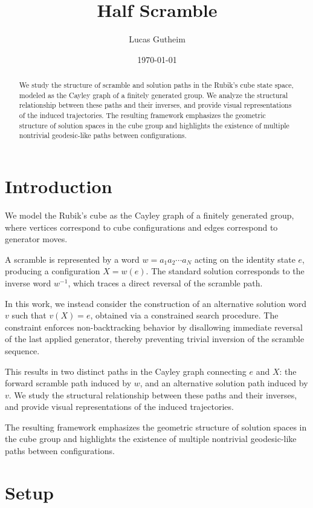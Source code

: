 \documentclass{article}
\title{Half Scramble}
\author{Lucas Gutheim}
\date{\today}
\begin{document}
\maketitle

\begin{abstract}
	We study the structure of scramble and solution paths in the Rubik's cube state space, modeled as the Cayley graph of a finitely generated group. We analyze the structural relationship between these paths and their inverses, and provide visual representations of the induced trajectories. The resulting framework emphasizes the geometric structure of solution spaces in the cube group and highlights the existence of multiple nontrivial geodesic-like paths between configurations.
\end{abstract}

\section{Introduction}

We model the Rubik's cube as the Cayley graph of a finitely generated group, where vertices correspond to cube configurations and edges correspond to generator moves.

A scramble is represented by a word $w = a_1 a_2 \cdots a_N$ acting on the identity state $e$, producing a configuration $X = w(e)$. The standard solution corresponds to the inverse word $w^{-1}$, which traces a direct reversal of the scramble path.

In this work, we instead consider the construction of an alternative solution word $v$ such that $v(X) = e$, obtained via a constrained search procedure. The constraint enforces non-backtracking behavior by disallowing immediate reversal of the last applied generator, thereby preventing trivial inversion of the scramble sequence.

This results in two distinct paths in the Cayley graph connecting $e$ and $X$: the forward scramble path induced by $w$, and an alternative solution path induced by $v$. We study the structural relationship between these paths and their inverses, and provide visual representations of the induced trajectories.

The resulting framework emphasizes the geometric structure of solution spaces in the cube group and highlights the existence of multiple nontrivial geodesic-like paths between configurations.

\newpage

\section{Setup}
\end{document}
